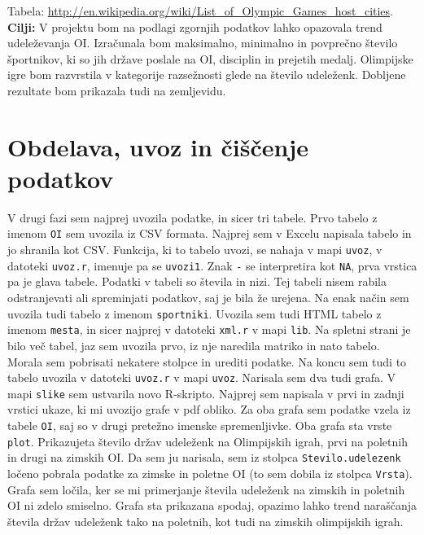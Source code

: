 \documentclass[11pt,a4paper]{article}
\begin{document}
 Tabela:
\url{http://en.wikipedia.org/wiki/List_of_Olympic_Games_host_cities}.
\newline
\textbf{Cilji:} V projektu bom na podlagi zgornjih podatkov lahko opazovala trend udeleževanja OI. 
Izračunala bom maksimalno, minimalno in povprečno število športnikov, ki so jih države poslale na OI, disciplin in prejetih medalj. 
Olimpijske igre bom razvrstila v kategorije razsežnosti glede na število udeleženk. Dobljene rezultate bom prikazala tudi 
na zemljevidu.

\newpage
\section{Obdelava, uvoz in čiščenje podatkov}
V drugi fazi sem najprej uvozila podatke, in sicer tri tabele. Prvo tabelo z imenom \verb|OI| sem uvozila iz CSV formata. Najprej sem v Excelu napisala tabelo in jo shranila kot CSV. Funkcija, ki to tabelo uvozi, se nahaja v mapi \verb|uvoz|, v datoteki \verb|uvoz.r|, imenuje pa se \verb|uvozi1|. Znak \verb|-| se interpretira kot \verb|NA|, prva vrstica pa je glava tabele. Podatki v tabeli so števila in nizi. Tej tabeli nisem rabila odstranjevati  ali spreminjati podatkov, saj je bila že urejena.
\newline
Na enak način sem uvozila tudi tabelo z imenom \verb|sportniki|.
\newline
Uvozila sem tudi HTML tabelo z imenom \verb|mesta|, in sicer najprej v datoteki \verb|xml.r| v mapi \verb|lib|. Na spletni strani je bilo več tabel, jaz sem uvozila prvo, iz nje naredila matriko in nato tabelo. Morala sem pobrisati nekatere stolpce in urediti podatke. Na koncu sem tudi to tabelo uvozila v datoteki \verb|uvoz.r| v mapi \verb|uvoz|.
\newline
Narisala sem dva tudi grafa. V mapi \verb|slike| sem ustvarila novo R-skripto. Najprej sem napisala v prvi in zadnji vrstici ukaze, ki mi uvozijo grafe v pdf obliko. Za oba grafa sem podatke vzela iz tabele \verb|OI|, saj so v drugi pretežno imenske spremenljivke.
Oba grafa sta vrste \verb|plot|. Prikazujeta število držav udeleženk na Olimpijskih igrah, prvi na poletnih in drugi na zimskih OI. Da sem ju narisala, sem iz stolpca \verb|Stevilo.udelezenk| ločeno pobrala podatke za zimske in poletne OI (to sem dobila iz stolpca \verb|Vrsta|). Grafa sem ločila, ker se mi primerjanje števila udeleženk na zimskih in poletnih OI ni zdelo smiselno.
\newline
Grafa sta prikazana spodaj, opazimo lahko trend naraščanja števila držav udeleženk tako na poletnih, kot tudi na zimskih olimpijskih igrah.
 
\end{document}

